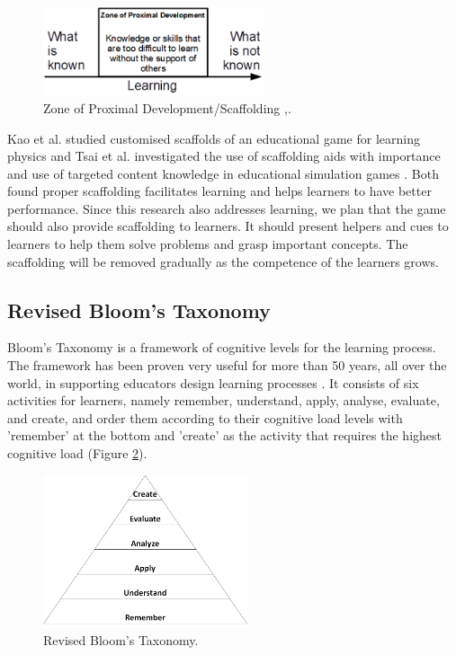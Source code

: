\documentclass[12pt, a4paper]{report}
\begin{document}
\begin{figure}[ht]
\centering
\includegraphics[width=6.5cm]{scaffolding}
\caption{Zone of Proximal Development/Scaffolding \cite{vygotsky1978mind},\cite{wood1976role}.}
\label{scaffolding}
\end{figure}

Kao et al. studied customised scaffolds of an educational game for learning physics \cite{kao2015designing} and Tsai et al. investigated the use of scaffolding aids with importance and use of targeted content knowledge in educational simulation games \cite{tsai2013importance}. Both found proper scaffolding facilitates learning and helps learners to have better performance. Since this research also addresses learning, we plan that the game should also provide scaffolding to learners. It should present helpers and cues to learners to help them solve problems and grasp important concepts. The scaffolding will be removed gradually as the competence of the learners grows.

\subsection{Revised Bloom's Taxonomy}
Bloom's Taxonomy \cite{krathwohl2002revision} is a framework of cognitive levels for the learning process. The framework has been proven very useful for more than 50 years, all over the world, in supporting educators design learning processes \cite{munzenmaier2013bloom}. It consists of six activities for learners, namely remember, understand, apply, analyse, evaluate, and create, and order them according to their cognitive load levels with 'remember' at the bottom and 'create' as the activity that requires the highest cognitive load (Figure \ref{bloom}). 

\begin{figure}[ht]
\centering
\includegraphics[width=6cm]{bloom}
\caption{Revised Bloom's Taxonomy\cite{krathwohl2002revision}.}
\label{bloom}
\end{figure}
\end{document}
